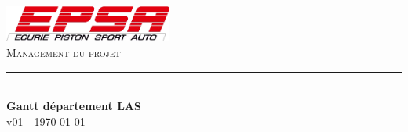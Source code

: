 \documentclass[]{article} %
\begin{document}
\begin{titlepage}
	
	\newcommand{\HRule}{\rule{\linewidth}{0.5mm}} %
	
	\center %
	    \includegraphics[height=1.2cm]{logo}
	\\[1cm]
	\textsc{\LARGE Management du projet} 
	\HRule \\[0.4cm]
	{ \huge \bfseries Gantt département LAS}  \\[1cm] %
	
	 {\large v01 - \today}\\[1cm] 

\end{titlepage}







%
\end{document}
